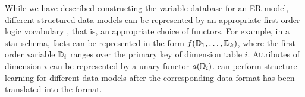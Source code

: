 %


%

While we have described constructing the variable database for an ER model, different structured data models can be represented by an appropriate first-order logic vocabulary \cite{Kimmig2015}, that is, an appropriate choice of functors. For example, in a star schema, facts can be represented in the form $f(\mathbb{D}_{1},\ldots,\mathbb{D}_{k})$, where the first-order variable $\mathbb{D}_{i}$ ranges over the primary key of dimension table $i$. Attributes of dimension $i$ can be represented by a unary functor $a(\mathbb{D}_{i})$. \FB can perform structure learning for different data models after the corresponding data format has been translated into the \RVD format.

%

